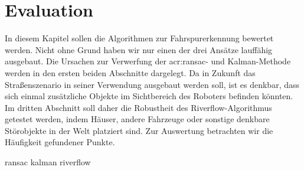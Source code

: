 \chapter{Evaluation}

In diesem Kapitel sollen die Algorithmen zur Fahrspurerkennung bewertet werden. Nicht ohne Grund haben wir nur einen der drei Ansätze lauffähig ausgebaut. Die Ursachen zur Verwerfung der \gls{acr:ransac}- und Kalman-Methode werden in den ersten beiden Abschnitte dargelegt. 
Da in Zukunft das Straßenszenario in seiner Verwendung ausgebaut werden soll, ist es denkbar, dass sich einmal zusätzliche Objekte im Sichtbereich des Roboters befinden könnten. Im dritten Abschnitt soll daher die Robustheit des Riverflow-Algorithmus getestet werden, indem Häuser, andere Fahrzeuge oder sonstige denkbare Störobjekte in der Welt platziert sind. Zur Auswertung betrachten wir die Häufigkeit gefundener Punkte.

{ransac}
{kalman}
{riverflow}
